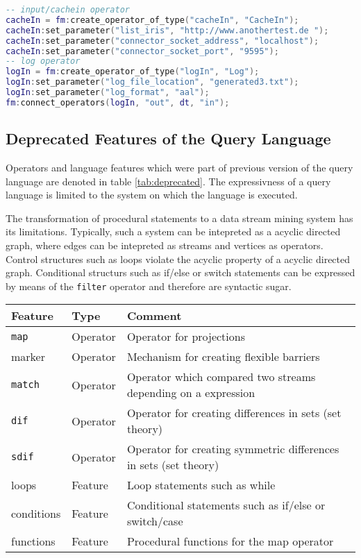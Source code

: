 \begin{lstlisting}[language=Lua, caption={\emph{Generated LUA code of System Operators}},label={lst:exanlua}]
-- input/cachein operator
cacheIn = fm:create_operator_of_type("cacheIn", "CacheIn");
cacheIn:set_parameter("list_iris", "http://www.anothertest.de ");
cacheIn:set_parameter("connector_socket_address", "localhost");
cacheIn:set_parameter("connector_socket_port", "9595");
-- log operator
logIn = fm:create_operator_of_type("logIn", "Log");
logIn:set_parameter("log_file_location", "generated3.txt");
logIn:set_parameter("log_format", "aal");
fm:connect_operators(logIn, "out", dt, "in");
\end{lstlisting}

\subsection{Deprecated Features of the Query Language}
Operators and language features which were part of previous version of the query
language are denoted in table \ref{tab:deprecated}. The expressivness of a query
language is limited to the system on which the language is executed.

The transformation of procedural statements to a data stream mining system
has its limitations. Typically, such a system can be intepreted as a acyclic 
directed graph, where edges can be intepreted as streams and vertices as 
operators. Control structures such as loops violate the acyclic property of a 
acyclic directed graph. Conditional structurs such as 
if/else or switch statements can be expressed by means of the \texttt{filter}
operator and therefore are syntactic sugar. 
\begin{center}
  \begin{tabular}{|l|l|l|}
  \hline
  \textbf{Feature} & \textbf{Type} & \textbf{Comment} \\
  \hline
  \hline
  \texttt{map} & Operator & Operator for projections \\
  \hline
  marker & Operator & Mechanism for creating flexible barriers \\
  \hline
  \texttt{match} & Operator & Operator which compared two streams depending on a expression \\
  \hline
  \texttt{dif} & Operator & Operator for creating differences in sets (set theory) \\
  \hline
  \texttt{sdif} & Operator & Operator for creating symmetric differences in sets (set theory) \\
  \hline
  loops & Feature & Loop statements such as while  \\
  \hline
  conditions & Feature & Conditional statements such as if/else or switch/case \\
  \hline
  functions & Feature & Procedural functions for the map operator \\
  \hline
  \end{tabular}
  \label{tab:deprecated}
\end{center}

